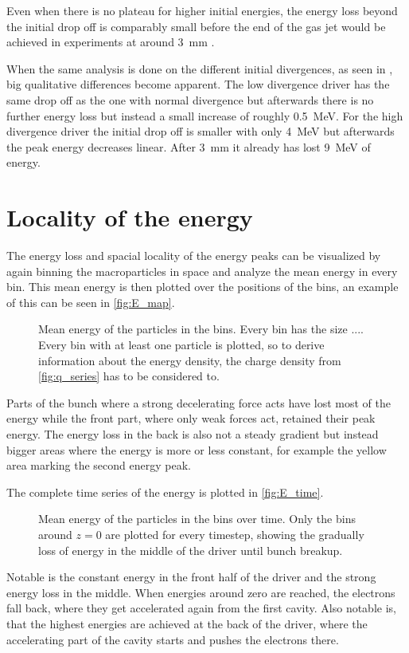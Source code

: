 \documentclass[bachelor_thesis]{subfiles}
\begin{document}
Even when there is no plateau for higher initial energies, the energy loss beyond the initial drop off is comparably small before the end of the gas jet would be achieved in experiments at around \qty{3}{\mm} \cite{Schoebel2022}.


When the same analysis is done on the different initial divergences, as seen in , big qualitative differences become apparent. The low divergence driver has the same drop off as the one with normal divergence but afterwards
there is no further energy loss but instead a small increase of roughly \qty{0.5}{\MeV}. For the high divergence driver the initial drop off is smaller with only \qty{4}{\MeV} but afterwards the peak energy decreases linear. After \qty{3}{\mm}
it already has lost \qty{9}{\MeV} of energy. 

\section{Locality of the energy}\label{chap:loc_E}
The energy loss and spacial locality of the energy peaks can be visualized by again binning the macroparticles in space and analyze the mean energy in every bin. This mean energy is then plotted over the positions of the bins,
an example of this can be seen in \autoref{fig:E_map}. 
\begin{figure}
	\centering
	\missingfigure{}
	\caption{Mean energy of the particles in the bins. Every bin has the size .... Every bin with at least one particle is plotted, so to derive information about the energy density, the charge density from \autoref{fig:q_series} has to be considered to.}
	\label{fig:E_map}
\end{figure}

Parts of the bunch where a strong decelerating force acts have lost most of the energy while the front part, where only weak forces act, retained their peak energy. The energy loss in the back is also not a steady gradient but instead bigger areas where the energy is more or less constant, 
for example the yellow area marking the second energy peak.

The complete time series of the energy is plotted in \autoref{fig:E_time}.
\begin{figure}
	\centering
	\missingfigure{}
	\caption{Mean energy of the particles in the bins over time. Only the bins around $z=0$ are plotted for every timestep, showing the gradually loss of energy in the middle of the driver until bunch breakup.}
	\label{fig:E_time}
\end{figure}
Notable is the constant energy in the front half of the driver and the strong energy loss in the middle. When energies around zero are reached, the electrons fall back, where they get accelerated again from the first cavity.
Also notable is, that the highest energies are achieved at the back of the driver, where the accelerating part of the cavity starts and pushes the electrons there.
\end{document}
